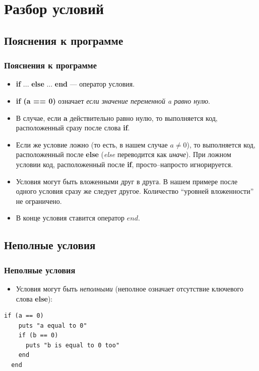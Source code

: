\documentclass[compress,red]{beamer}
\begin{document}
\section{Разбор условий}
\subsection{Пояснения к программе}
\begin{frame}
  \frametitle{Пояснения к программе}
	\begin{itemize}
	  \item \textbf{if} ... \textbf{else} ... \textbf{end} --- оператор условия.
	  \item \textbf{if (a == 0)} означает \emph{если значение переменной a равно нулю}.
	  \item В случае, если \textbf{a} действительно равно нулю, то выполняется код, расположенный сразу после слова \textbf{if}.
	  \item Если же условие ложно (то есть, в нашем случае $a \neq 0$), то выполняется код, расположенный после \textbf{else} (\emph{else} переводится как \emph{иначе}). При ложном условии код, расположенный после \textbf{if}, просто--напросто игнорируется.
	  \item Условия могут быть вложенными друг в друга. В нашем примере после одного условия сразу же следует другое. Количество ``уровней вложенности'' не ограничено.
	  \item В конце условия ставится оператор $end$.
	\end{itemize}
\end{frame}

\subsection{Неполные условия}
\begin{frame}[fragile]
  \frametitle{Неполные условия}
	\begin{itemize}
	  \item Условия могут быть \emph{неполными} (неполное означает отсутствие ключевого слова \textbf{else}):
	\end{itemize}
	
  \begin{lstlisting}[label=ruby2,caption=Неполное условие]
  if (a == 0)
    puts "a equal to 0"
    if (b == 0)
      puts "b is equal to 0 too"
    end
  end
  \end{lstlisting}

\end{frame}
\end{document}
